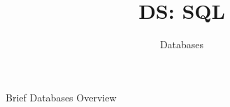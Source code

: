 \documentclass[aspectratio=169]{../latex_main/tntbeamer}  %
\title[Introduction]{DS: SQL}
\subtitle{Databases}
\begin{document}
	
	\maketitle
	\begin{frame}{Brief Databases Overview}
	    
	\end{frame}
	
	
	
	
	
	
\end{document}
